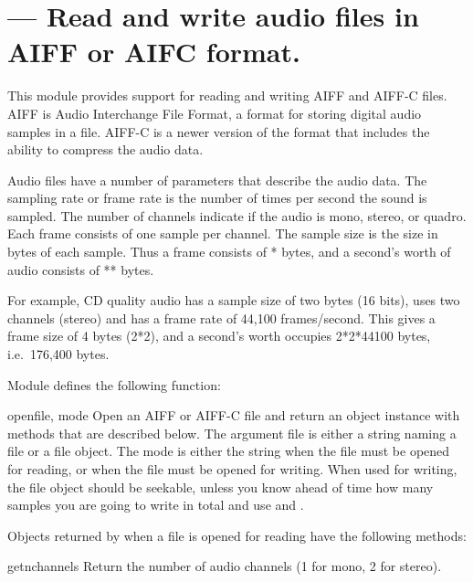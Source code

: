 \section{ ---
         Read and write audio files in AIFF or AIFC format.}



This module provides support for reading and writing AIFF and AIFF-C
files.  AIFF is Audio Interchange File Format, a format for storing
digital audio samples in a file.  AIFF-C is a newer version of the
format that includes the ability to compress the audio data.

Audio files have a number of parameters that describe the audio data.
The sampling rate or frame rate is the number of times per second the
sound is sampled.  The number of channels indicate if the audio is
mono, stereo, or quadro.  Each frame consists of one sample per
channel.  The sample size is the size in bytes of each sample.  Thus a
frame consists of * bytes, and a
second's worth of audio consists of
** bytes.

For example, CD quality audio has a sample size of two bytes (16
bits), uses two channels (stereo) and has a frame rate of 44,100
frames/second.  This gives a frame size of 4 bytes (2*2), and a
second's worth occupies 2*2*44100 bytes, i.e.\ 176,400 bytes.

Module  defines the following function:

\begin{funcdesc}{open}{file, mode}
Open an AIFF or AIFF-C file and return an object instance with
methods that are described below.  The argument file is either a
string naming a file or a file object.  The mode is either the string
 when the file must be opened for reading, or 
when the file must be opened for writing.  When used for writing, the
file object should be seekable, unless you know ahead of time how many
samples you are going to write in total and use
 and .
\end{funcdesc}

Objects returned by  when a file is opened for
reading have the following methods:

\begin{methoddesc}[aifc]{getnchannels}{}
Return the number of audio channels (1 for mono, 2 for stereo).
\end{methoddesc}

